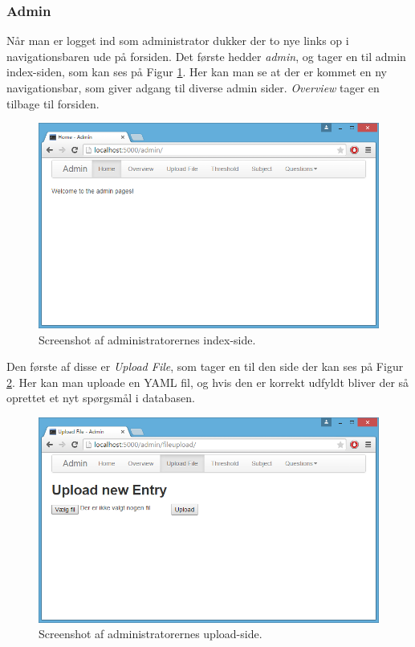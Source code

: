 \documentclass[11pt, a4paper]{article}
\begin{document}
\FloatBarrier

\subsubsection{Admin}
\label{subsub:screenshots_admin}
Når man er logget ind som administrator dukker der to nye links op i navigationsbaren ude på forsiden. Det første hedder \emph{admin}, og tager en til admin index-siden, som kan ses på Figur \ref{fig:screenshot_admin_home}. Her kan man se at der er kommet en ny navigationsbar, som giver adgang til diverse admin sider. \emph{Overview} tager en tilbage til forsiden.

\begin{figure}[htpb]
    \centering
    \includegraphics[width=1\linewidth]{figures/interface/admin_home.png}
    \caption{Screenshot af administratorernes index-side.}
    \label{fig:screenshot_admin_home}
\end{figure}

Den første af disse er \emph{Upload File}, som tager en til den side der kan ses på Figur \ref{fig:screenshot_admin_upload}. Her kan man uploade en YAML fil, og hvis den er korrekt udfyldt bliver der så oprettet et nyt spørgsmål i databasen.

\begin{figure}[htpb]
    \centering
    \includegraphics[width=1\linewidth]{figures/interface/admin_upload.png}
    \caption{Screenshot af administratorernes upload-side.}
    \label{fig:screenshot_admin_upload}
\end{figure}
\end{document}

